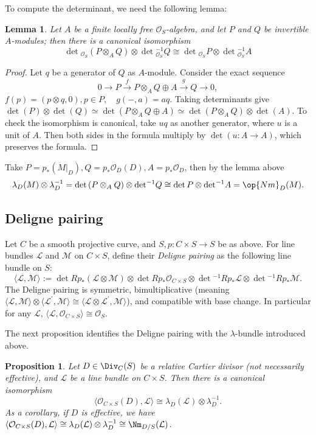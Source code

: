 \documentclass{amsart}
\numberwithin{equation}{section}
\numberwithin{figure}{section}
\newtheorem{lem}[thm]{Lemma}
\newtheorem{prop}[thm]{Proposition}
\theoremstyle{definition}
\theoremstyle{remark}
\renewcommand{\c}[1]{\mathcal{#1}}
\begin{document}
To compute the determinant, we need the following lemma:
\begin{lem}
Let $A$ be a finite locally free $\c O_S$-algebra, and let $P$ and $Q$ be invertible $A$-modules; then there is a canonical isomorphism
$$\det\!_{\c O_S} \left( P\otimes_{A}Q\right)\otimes\det\!_{\c O_S}^{-1} Q\cong \det\!_{\c O_S}  P\otimes \det\!_{\c O_S}^{-1}A$$
\end{lem}
\begin{proof}
Let $q$ be a generator of $Q$ as $A$-module. Consider the exact sequence
$$0\to P\xrightarrow{f} P\otimes_AQ\oplus A\xrightarrow{g}Q\to 0,$$
$f(p)=(p\otimes q,0), p\in P,\quad  g(-,a)=aq$. Taking determinants give $\det(P)\otimes \det(Q)\simeq \det(P\otimes_AQ\oplus A)\simeq \det(P\otimes_AQ)\otimes \det(A)$.
To check the isomorphism is canonical, take $uq$ as another generator, where $u$ is a unit of $A$. Then both sides in the formula multiply by $\det(u:A\to A)$, which preserves the formula. 
\end{proof}
Take $P=p_* \left(M|_D \right), Q=p_*\c O_D(D), A=p_*\c O_D$, then	 by the lemma above 
$$\lambda_D(M)\otimes \lambda_D^{-1}=\det \left( P\otimes_{A}Q\right)\otimes\det\!^{-1} Q\cong \det  P\otimes \det\!^{-1}A=\op{Nm}_D(M).$$

\subsection{Deligne pairing \cite{deligne67determinant}}
Let $C$ be a smooth projective curve, and $S, p:C\times S\to S$ be as above. For line bundles $\c L$ and $\c M$ on $C\times S$, define their \emph{Deligne pairing} as the following line bundle on $S$:
\[\langle \c L,\c M\rangle
:={}\det Rp_*(\c L\otimes \c M)
\otimes\det Rp_*\c O_{C\times S}
\otimes\det\!^{-1}Rp_*\c L
\otimes\det\!^{-1}Rp_*\c M.
\]
The Deligne pairing is symmetric, bimultiplicative (meaning $\langle \c L,\c M\rangle\otimes\langle \c L^\prime, \c M\rangle\cong \langle \c L\otimes \c L^\prime,\c M\rangle$), and compatible with base change. In particular for any $\c L$,
$\langle \c L,\c O_{C\times S}\rangle\cong\c O_S.$

The next proposition identifies the Deligne pairing with the 
$\lambda$-bundle introduced above.

\begin{prop}
	\label{prop:deligne-lambda}
	Let $D\in\Div_C(S)$ be a relative Cartier divisor (not necessarily effective), and  $\c L$ be a line bundle on $C\times S$. Then there is a canonical isomorphism
	\[	\langle\c O_{C\times S}(D),\c L\rangle
	\cong	\lambda_D(\c L)\otimes\lambda_D^{-1}.	\]
 As a corollary, if $D$ is effective, we have
	$\langle\c O_{C\times S}(D),\c L\rangle
	\cong \lambda_D(\c L)\otimes\lambda_D^{-1}\cong 
	\Nm_{D/S}(\c L)$.
\end{prop}
\end{document}
